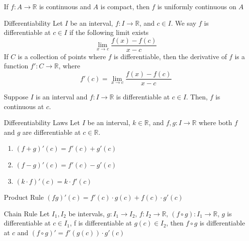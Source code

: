 \documentclass[12pt]{article}
\begin{document}
\begin{proposition}{}{}
    If $ f: A \to \mathbb{R} $ is continuous and $ A $ is compact, then $ f $ is uniformly continuous on $ A $
\end{proposition}
\begin{definition}{Differentiability}{}
    Let $ I $ be an interval, $ f : I \to \mathbb{R} $, and $ c \in I $. We say $ f $ is differentiable at $ c \in I $ if the following limit exists
    \[ \lim_{x \to c} \frac{f \left( x \right) - f \left( c \right)}{x - c} \]
    If $ C $ is a collection of points where $ f $ is differentiable, then the derivative of $ f $ is a function $ f' : C \to \mathbb{R} $, where
    \[ f' \left( c \right) = \lim_{x \to c} \frac{f \left( x \right) - f \left( c \right)}{x - c} \]
\end{definition}
\begin{theorem}
    Suppose $ I $ is an interval and $ f : I \to \mathbb{R} $ is differentiable at $ c \in I $. Then, $ f $ is continuous at $ c $.
\end{theorem}
\begin{laws}{Differentiability Laws}{}
    Let $ I $ be an interval, $ k \in \mathbb{R} $, and $ f, g : I \to \mathbb{R} $ where both $ f $ and $ g $ are differentiable at $ c \in \mathbb{R} $.
    \begin{enumerate}
        \item $ \left( f + g \right)' \left( c \right) = f' \left( c \right) + g' \left( c \right) $
        \item $ \left( f - g \right)' \left( c \right) = f' \left( c \right) - g' \left( c \right) $
        \item $ \left( k \cdot f \right)' \left( c \right) = k \cdot f' \left( c \right) $
    \end{enumerate}
\end{laws}
\begin{theorem}{Product Rule}{}
    $ \left( fg \right)' \left( c \right) = f' \left( c \right) \cdot g \left( c \right) + f \left( c \right) \cdot g' \left( c \right) $
\end{theorem}
\begin{theorem}{Chain Rule}{}
    Let $ I_1, I_2 $ be intervals, $ g: I_1 \to I_2 $, $ f: I_2 \to \mathbb{R} $, $ \left( f \circ g \right): I_1 \to \mathbb{R} $, $ g $ is differentiable at $ c \in I_1 $, f is differentiable at $ g \left( c \right) \in I_2 $, then $ f \circ g $ is differentiable at $ c $ and $ \left( f \circ g \right)' = f' \left( g \left( c \right) \right) \cdot g' \left( c \right) $
\end{theorem}
\end{document}
